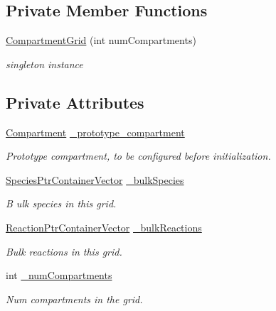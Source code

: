 \subsection*{Private Member Functions}
\begin{DoxyCompactItemize}
\item 
\hyperlink{classCompartmentGrid_af304aa05f7bccd48f955aff57659e6ee}{Compartment\+Grid} (int num\+Compartments)
\begin{DoxyCompactList}\small\item\em singleton instance \end{DoxyCompactList}\end{DoxyCompactItemize}
\subsection*{Private Attributes}
\begin{DoxyCompactItemize}
\item 
\hyperlink{classCompartment}{Compartment} \hyperlink{classCompartmentGrid_a0dd5ebffc52820b92a932335048a11a7}{\+\_\+prototype\+\_\+compartment}
\begin{DoxyCompactList}\small\item\em Prototype compartment, to be configured before initialization. \end{DoxyCompactList}\item 
\hyperlink{classSpeciesPtrContainerVector}{Species\+Ptr\+Container\+Vector} \hyperlink{classCompartmentGrid_ae514970414a3ffc396e734f67a08e961}{\+\_\+bulk\+Species}
\begin{DoxyCompactList}\small\item\em B ulk species in this grid. \end{DoxyCompactList}\item 
\hyperlink{classReactionPtrContainerVector}{Reaction\+Ptr\+Container\+Vector} \hyperlink{classCompartmentGrid_a7b6e64e307a53d9f3395d2dab865c119}{\+\_\+bulk\+Reactions}
\begin{DoxyCompactList}\small\item\em Bulk reactions in this grid. \end{DoxyCompactList}\item 
int \hyperlink{classCompartmentGrid_a3f56638a21f59ed7877b0abbf0de1cde}{\+\_\+num\+Compartments}
\begin{DoxyCompactList}\small\item\em Num compartments in the grid. \end{DoxyCompactList}\end{DoxyCompactItemize}
